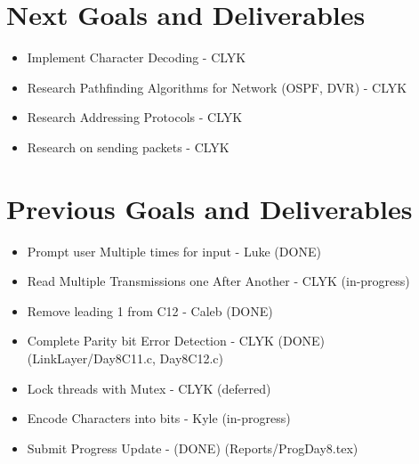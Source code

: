 \documentclass{article}
\begin{document}
\section*{Next Goals and Deliverables}
\begin{itemize}
\item Implement Character Decoding - CLYK
\item Research Pathfinding Algorithms for Network (OSPF, DVR) - CLYK
\item Research Addressing Protocols - CLYK
\item Research on sending packets - CLYK

\end{itemize}
\section*{Previous Goals and Deliverables}
\begin{itemize}

\item Prompt user Multiple times for input - Luke (DONE) 
\item Read Multiple Transmissions one After Another - CLYK (in-progress)
\item Remove leading 1 from C12 - Caleb (DONE)
\item Complete Parity bit Error Detection - CLYK (DONE) (LinkLayer/Day8C11.c, Day8C12.c)
\item Lock threads with Mutex - CLYK (deferred)
\item Encode Characters into bits - Kyle (in-progress)
\item Submit Progress Update - (DONE) (Reports/ProgDay8.tex)
\end{itemize}
\end{document}

